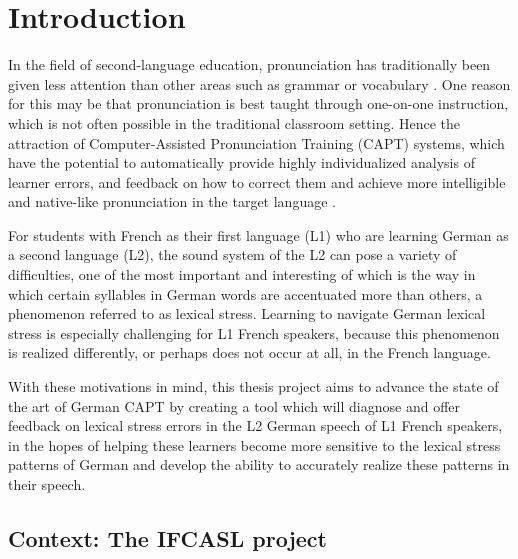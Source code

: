 %
%
\chapter{Introduction}
\label{chap:intro}


In the field of second-language education, pronunciation has traditionally been given less attention than other areas such as grammar or vocabulary \parencite{Derwing2005}. One reason for this may be that pronunciation is best taught through one-on-one instruction, which is not often possible in the traditional classroom setting. Hence the attraction of Computer-Assisted Pronunciation Training (CAPT) systems, which have the potential to automatically provide highly individualized analysis of learner errors, and feedback on how to correct them and achieve more intelligible and native-like pronunciation in the target language \parencite{witt2012}. 


For students with French as their first language (L1) who are learning German as a second language (L2), the sound system of the L2 can pose a variety of difficulties, one of the most important and interesting of which is the way in which certain syllables in German words are accentuated more than others, a phenomenon referred to as lexical stress. Learning to navigate German lexical stress is especially challenging for L1 French speakers, because this phenomenon is realized differently, or perhaps does not occur at all, in the French language. 

With these motivations in mind, this thesis project aims to advance the state of the art of German CAPT %
by creating a tool which will diagnose and offer feedback on lexical stress errors in the L2 German speech of L1 French speakers, in the hopes of helping these learners become more sensitive to the lexical stress patterns of German and develop the ability to accurately realize these patterns in their speech. 

\section{Context: The IFCASL project}
\label{sec:intro:ifcasl}

